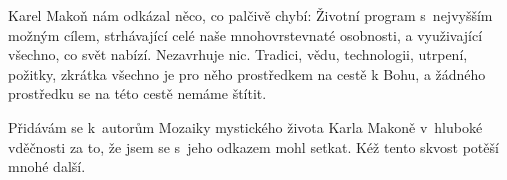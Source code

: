 Karel Makoň nám odkázal něco, co palčivě chybí: Životní program s~nejvyšším
možným cílem, strhávající celé naše mnohovrstevnaté osobnosti, a využivající
všechno, co svět nabízí. Nezavrhuje nic. Tradici, vědu, technologii, utrpení,
požitky, zkrátka všechno je pro něho prostředkem na cestě k Bohu, a žádného
prostředku se na této cestě nemáme štítit.

Přidávám se k~autorům Mozaiky mystického života Karla Makoně v~hluboké vděčnosti
za to, že jsem se s~jeho odkazem mohl setkat. Kéž tento skvost potěší mnohé
další.
